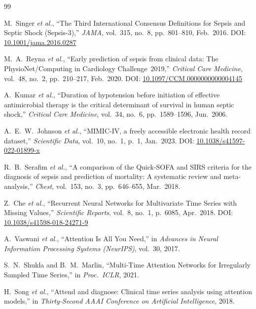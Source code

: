 \documentclass[conference,12pt]{IEEEtran}
\begin{document}
\begin{thebibliography}{99}

M.~Singer \textit{et al.},
``The Third International Consensus Definitions for Sepsis and Septic Shock
(Sepsis-3),''
\textit{JAMA}, vol.~315, no.~8, pp.~801--810, Feb.~2016.
\newblock DOI: \href{https://doi.org/10.1001/jama.2016.0287}{10.1001/jama.2016.0287}

M.~A.~Reyna \textit{et al.},
``Early prediction of sepsis from clinical data: The PhysioNet/Computing in
Cardiology Challenge~2019,''
\textit{Critical Care Medicine}, vol.~48, no.~2, pp.~210--217, Feb.~2020.
\newblock DOI: \href{https://doi.org/10.1097/CCM.0000000000004145}{10.1097/CCM.0000000000004145}

A.~Kumar \textit{et al.},
``Duration of hypotension before initiation of effective antimicrobial therapy
is the critical determinant of survival in human septic shock,''
\textit{Critical Care Medicine}, vol.~34, no.~6, pp.~1589--1596, Jun.~2006.

A.~E.~W.~Johnson \textit{et al.},
``MIMIC-IV, a freely accessible electronic health record dataset,''
\textit{Scientific Data}, vol.~10, no.~1, p.~1, Jan.~2023.
\newblock DOI: \href{https://doi.org/10.1038/s41597-022-01899-x}{10.1038/s41597-022-01899-x}

R.~B.~Serafim \textit{et al.},
``A comparison of the Quick-SOFA and SIRS criteria for the diagnosis of sepsis
and prediction of mortality: A systematic review and meta-analysis,''
\textit{Chest}, vol.~153, no.~3, pp.~646--655, Mar.~2018.

Z.~Che \textit{et al.},
``Recurrent Neural Networks for Multivariate Time Series with Missing Values,''
\textit{Scientific Reports}, vol.~8, no.~1, p.~6085, Apr.~2018.
\newblock DOI: \href{https://doi.org/10.1038/s41598-018-24271-9}{10.1038/s41598-018-24271-9}

A.~Vaswani \textit{et al.},
``Attention Is All You Need,''
in \textit{Advances in Neural Information Processing Systems (NeurIPS)},
vol.~30, 2017.

S.~N.~Shukla and B.~M.~Marlin,
``Multi-Time Attention Networks for Irregularly Sampled Time Series,''
in \textit{Proc.\ ICLR}, 2021.

H.~Song \textit{et al.},
``Attend and diagnose: Clinical time series analysis using attention models,''
in \textit{Thirty-Second AAAI Conference on Artificial Intelligence}, 2018.


\end{thebibliography}
\end{document}
